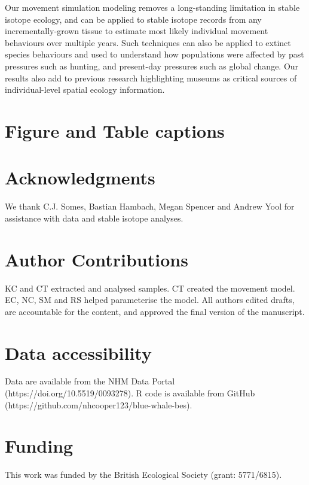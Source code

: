 \documentclass[a4paper,12pt]{article}
\begin{document}
Our movement simulation modeling removes a long-standing limitation in stable isotope ecology, and can be applied to stable isotope records from any incrementally-grown tissue to estimate most likely individual movement behaviours over multiple years. 
Such techniques can also be applied to extinct species behaviours and used to understand how populations were affected by past pressures such as hunting, and present-day pressures such as global change.
Our results also add to previous research \cite{lister2011natural,ryan2013stable} highlighting museums as critical sources of individual-level spatial ecology information.

\section{Figure and Table captions}

\section{Acknowledgments}
We thank C.J. Somes, Bastian Hambach, Megan Spencer and Andrew Yool for assistance with data and stable isotope analyses.

\section{Author Contributions}
KC and CT extracted and analysed samples.
CT created the movement model.
EC, NC, SM and RS helped parameterise the model.
All authors edited drafts, are accountable for the content, and approved the final version of the manuscript.

\section{Data accessibility}
Data are available from the NHM Data Portal (https://doi.org/10.5519/0093278). 
R code is available from GitHub (https://github.com/nhcooper123/blue-whale-bes).

\section{Funding}
This work was funded by the British Ecological Society (grant: 5771/6815). 
\end{document}
